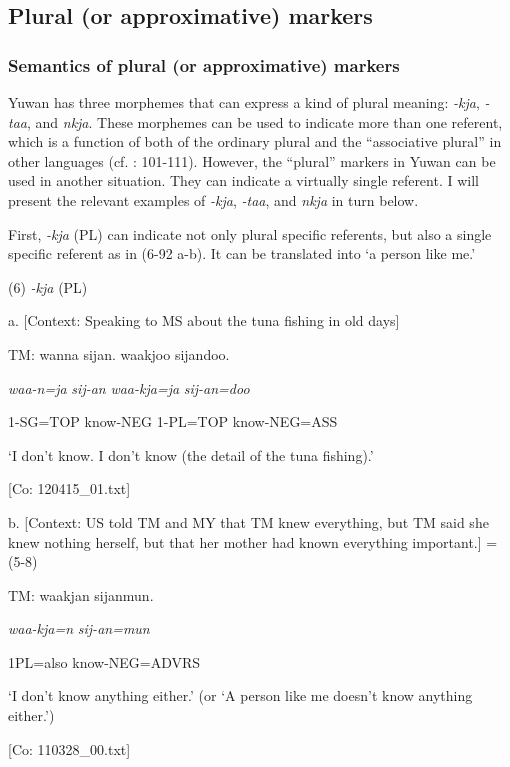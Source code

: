 \subsection{Plural (or approximative) markers}
\subsubsection{Semantics of plural (or approximative) markers}

Yuwan has three morphemes that can express a kind of plural meaning: \textit{-kja}, \textit{{}-taa}, and \textit{nkja}. These morphemes can be used to indicate more than one referent, which is a function of both of the ordinary plural and the “associative plural” in other languages (cf. \citealt{Corbett2000}: 101-111). However, the “plural” markers in Yuwan can be used in another situation. They can indicate a virtually single referent. I will present the relevant examples of \textit{{}-kja}, \textit{{}-taa}, and \textit{nkja} in turn below.

First, \textit{{}-kja} (PL) can indicate not only plural specific referents, but also a single specific referent as in (6-92 a-b). It can be translated into ‘a person like me.’

(6)  \textit{{}-kja} (PL)

  a.  [Context: Speaking to MS about the tuna fishing in old days]

    TM:  wanna  sijan.  waakjoo  sijandoo.

      \textit{waa-n=ja}  \textit{sij-an}  \textit{waa-kja=ja}  \textit{sij-an=doo}

      1-SG=TOP  know-NEG  1-PL=TOP  know-NEG=ASS

      ‘I don’t know. I don’t know (the detail of the tuna fishing).’

      [Co: 120415\_01.txt]

  b.  [Context: US told TM and MY that TM knew everything, but TM said she knew nothing herself, but that her mother had known everything important.] = (5-8)

    TM:  waakjan  sijanmun.

      \textit{waa-kja=n}  \textit{sij-an=mun}

      1PL=also  know-NEG=ADVRS

      ‘I don’t know anything either.’ (or ‘A person like me doesn’t know anything either.’)

      [Co: 110328\_00.txt]

